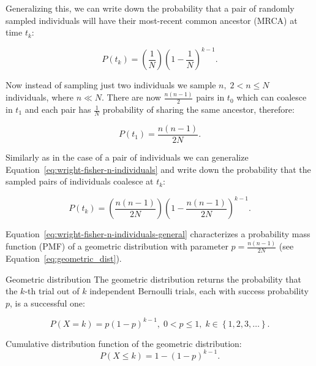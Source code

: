 Generalizing this, we can write down the probability that a pair of randomly sampled individuals will have their most-recent common ancestor (MRCA) at time $t_{k}$:

\begin{equation}
P\left(t_{k}\right)=\left(\frac{1}{N}\right)\left(1-\frac{1}{N}\right)^{k-1}.
\label{eq:wright-fisher-two-individuals}
\end{equation}

\noindent
Now instead of sampling just two individuals we sample $n,\;2<n\leq N$ individuals, where $n\ll N$.
There are now $\frac{n\left(n-1\right)}{2}$ pairs in $t_{0}$ which can coalesce in $t_{1}$ and each pair has  $\frac{1}{N}$ probability of sharing the same ancestor, therefore:

\begin{equation}
P\left(t_{1}\right)=\frac{n\left(n-1\right)}{2N}.
\label{eq:wright-fisher-n-individuals}
\end{equation}

\noindent
Similarly as in the case of a pair of individuals we can generalize Equation~\ref{eq:wright-fisher-n-individuals} and write down the probability that the sampled pairs of individuals coalesce at $t_{k}$:

\begin{equation}
P\left(t_{k}\right)=\left(\frac{n\left(n-1\right)}{2N}\right)\left(1-\frac{n\left(n-1\right)}{2N}\right)^{k-1}.
\label{eq:wright-fisher-n-individuals-general}
\end{equation}

\noindent
Equation~\ref{eq:wright-fisher-n-individuals-general} characterizes a probability mass function (PMF) of a geometric distribution with parameter $p=\frac{n\left(n-1\right)}{2N}$ (see Equation~\ref{eq:geometric_dist}).

\begin{remark}{Geometric distribution}
The geometric distribution returns the probability that the $k$-th trial out of $k$ independent Bernoulli trials, each with success probability $p$, is a successful one:

\begin{equation}
P\left(X=k\right)=p\left(1-p\right)^{k-1},\;0<p\leq1,\; k\in\left\{ 1,2,3,\ldots\right\}.
\label{eq:geometric_dist}
\end{equation}

\noindent
Cumulative distribution function of the geometric distribution:
\begin{equation}
P(X\leq k)=1-\left(1-p\right)^{k-1}.
\label{eq:geometric_cdf}
\end{equation}
\end{remark}


